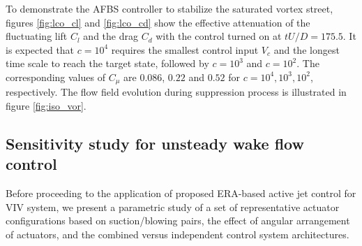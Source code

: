 \documentclass[standard]{jfm}
\begin{document}
To demonstrate the AFBS controller to stabilize the saturated vortex street, 
figures \ref{fig:lco_cl} and \ref{fig:lco_cd} show the effective attenuation of 
the fluctuating lift $C_l$ and the drag $C_d$ 
with the control turned on at $tU/D=175.5$. 
It is expected that $c=10^4$ requires the smallest control input $V_c$ and 
the longest time scale to reach the target state,
followed by $c=10^3$ and $c=10^2$. 
The corresponding values of $C_\mu$ are $0.086$, $0.22$ and $0.52$ 
for $c=10^4, 10^3, 10^2$, respectively. The flow field evolution during suppression 
process is illustrated in figure \ref{fig:iso_vor}. 
\subsection{Sensitivity study for unsteady wake flow control}\label{sec:sensitivity}
%
Before proceeding to the application of proposed ERA-based active jet control 
for VIV system,
we present a parametric study of a set of representative
actuator configurations based on suction/blowing pairs,
the effect of angular arrangement of actuators, and 
the combined versus independent control system architectures.
%
\end{document}
